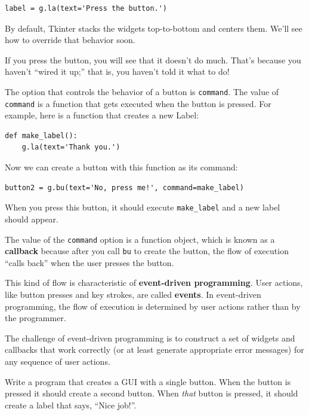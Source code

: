 \documentclass[10pt]{book}
\begin{document}
{\beforeverb
\begin{verbatim}
label = g.la(text='Press the button.')
\end{verbatim}
\afterverb
%
By default, Tkinter stacks the widgets top-to-bottom and centers
them.  We'll see how to override that behavior soon.

If you press the button, you will see that it doesn't do much.
That's because you haven't ``wired it up;'' that is, you haven't
told it what to do!

The option that controls the behavior of a button is {\tt command}.
The value of {\tt command} is a function that gets executed when
the button is pressed.  For example, here is a function that creates
a new Label:

\beforeverb
\begin{verbatim}
def make_label():
    g.la(text='Thank you.')
\end{verbatim}
\afterverb
%
Now we can create a button with this function as its command:

\beforeverb
\begin{verbatim}
button2 = g.bu(text='No, press me!', command=make_label)
\end{verbatim}
\afterverb
%
When you press this button, it should execute \verb"make_label"
and a new label should appear.


The value of the {\tt command} option
is a function object, which is known as a {\bf callback} because
after you call {\tt bu} to create the button, the flow of execution
``calls back'' when the user presses the button.


This kind of flow is characteristic of {\bf event-driven programming}.
User actions, like button presses and key strokes, are called {\bf
events}.  In event-driven programming, the flow of execution is
determined by user actions rather than by the programmer.  

The challenge of event-driven programming is to construct a set of
widgets and callbacks that work correctly (or at least generate
appropriate error messages) for any sequence of user actions.

\begin{ex}
Write a program that creates a GUI with a single button.  When the
button is pressed it should create a second button.  When
{\em that} button is pressed, it should create a label that
says, ``Nice job!''.


\end{ex}}
\end{document}

